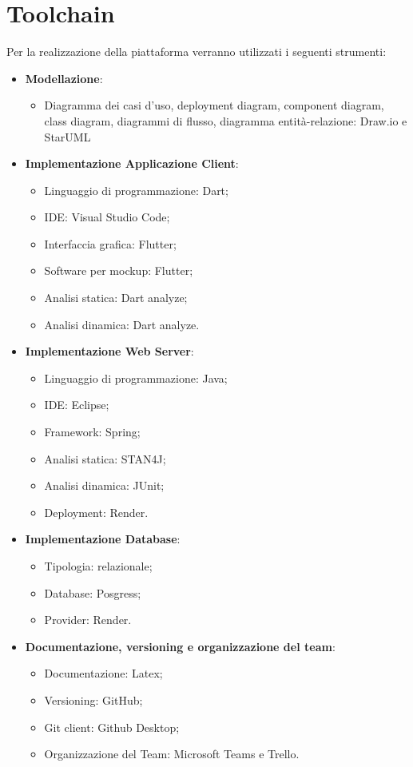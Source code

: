 \section{Toolchain}
Per la realizzazione della piattaforma verranno utilizzati i seguenti strumenti:
\begin{itemize}
	\item \textbf{Modellazione}:
	\begin{itemize}
		\item Diagramma dei casi d'uso, deployment diagram, component diagram, class
		diagram, diagrammi di flusso, diagramma entità-relazione: Draw.io e StarUML
	\end{itemize}
	\item \textbf{Implementazione Applicazione Client}:
	\begin{itemize}
		\item Linguaggio di programmazione: Dart;
		\item IDE: Visual Studio Code;
		\item Interfaccia grafica: Flutter;
		\item Software per mockup: Flutter;
		\item Analisi statica: Dart analyze;
		\item Analisi dinamica: Dart analyze.
	\end{itemize}
	\item \textbf{Implementazione Web Server}:
	\begin{itemize}
		\item Linguaggio di programmazione: Java;
		\item IDE: Eclipse;
		\item Framework: Spring;
		\item Analisi statica: STAN4J;
		\item Analisi dinamica: JUnit;
		\item Deployment: Render.
	\end{itemize}
	\item \textbf{Implementazione Database}:
	\begin{itemize}
		\item Tipologia: relazionale;
		\item Database: Posgress;
		\item Provider: Render.
	\end{itemize}
	\item \textbf{Documentazione, versioning e organizzazione del team}:
	\begin{itemize}
		\item Documentazione: Latex;
		\item Versioning: GitHub;
		\item Git client: Github Desktop;
		\item Organizzazione del Team: Microsoft Teams e Trello.
	\end{itemize}
\end{itemize}